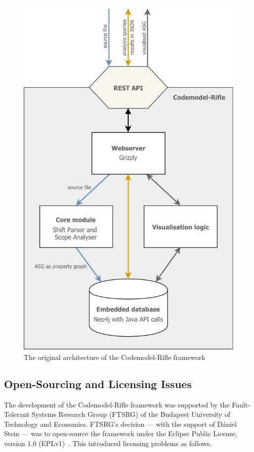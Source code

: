 \begin{figure}[!p]
	\centering
	\includegraphics[height=\textheight-18mm,clip]{figures/codemodel-rifle-original-architecture.pdf}
	\caption{The original architecture of the Codemodel-Rifle framework}
	\label{fig:codemodel-rifle-original-architecture}
\end{figure}


\subsection{Open-Sourcing and Licensing Issues}

The development of the Codemodel-Rifle framework was supported by the Fault-Tolerant Systems Research Group (FTSRG) of the Budapest University of Technology and Economics. FTSRG's decision — with the support of Dániel Stein — was to open-source the framework under the Eclipse Public License, version 1.0 (EPLv1)~\cite{eplv1}. This introduced licensing problems as follows.

